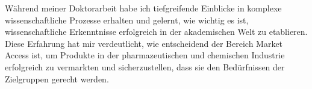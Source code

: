     {Während meiner Doktorarbeit habe ich tiefgreifende Einblicke in komplexe wissenschaftliche Prozesse erhalten und gelernt, wie wichtig es ist, wissenschaftliche Erkenntnisse erfolgreich in der akademischen Welt zu etablieren. Diese Erfahrung hat mir verdeutlicht, wie entscheidend der Bereich Market Access ist, um Produkte in der pharmazeutischen und chemischen Industrie erfolgreich zu vermarkten und sicherzustellen, dass sie den Bedürfnissen der Zielgruppen gerecht werden.\par}{}




